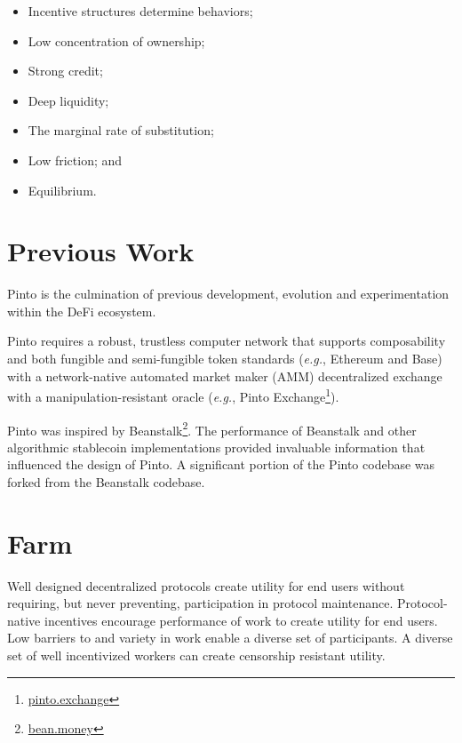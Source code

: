 \documentclass[tikz]{article}
\newcommand{\term}[1]{\textsl{#1}}
\newcommand{\fref}[1]{\footnote{\href{http://#1}{#1}}}
\begin{document}
\begin{itemize}[itemsep=0.03cm]
    \item Incentive structures determine behaviors;
    \item Low concentration of ownership;
    \item Strong credit;
    \item Deep liquidity;
    \item The marginal rate of substitution;
    \item Low friction; and
    \item Equilibrium.
\end{itemize}


\section{Previous Work}

Pinto is the culmination of previous development, evolution and experimentation within the DeFi ecosystem. 

Pinto requires a robust, trustless computer network that supports composability and both fungible and semi-fungible token standards (\term{e.g.}, Ethereum and Base) with a network-native automated market maker (AMM) decentralized exchange with a manipulation-resistant oracle (\term{e.g.}, Pinto Exchange\fref{pinto.exchange}). 

Pinto was inspired by Beanstalk\fref{bean.money}. The performance of Beanstalk and other algorithmic stablecoin implementations provided invaluable information that influenced the design of Pinto. A significant portion of the Pinto codebase was forked from the Beanstalk codebase.



\section{Farm}

Well designed decentralized protocols create utility for end users without requiring, but never preventing, participation in protocol maintenance. Protocol-native incentives encourage performance of work to create utility for end users. Low barriers to and variety in work enable a diverse set of participants. A diverse set of well incentivized workers can create censorship resistant utility. 
\end{document}
